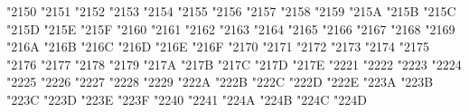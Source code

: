 {\Uchar\jis"2150 %
\Uchar\jis"2151 %
\Uchar\jis"2152 %
\Uchar\jis"2153 %
\Uchar\jis"2154 %
\Uchar\jis"2155 %
\Uchar\jis"2156 %
\Uchar\jis"2157 %
\Uchar\jis"2158 %
\Uchar\jis"2159 %
\Uchar\jis"215A %
\Uchar\jis"215B %
\Uchar\jis"215C %
\Uchar\jis"215D %
\Uchar\jis"215E %
\Uchar\jis"215F %
\Uchar\jis"2160 %
\Uchar\jis"2161 %
\Uchar\jis"2162 %
\Uchar\jis"2163 %
\Uchar\jis"2164 %
\Uchar\jis"2165 %
\Uchar\jis"2166 %
\Uchar\jis"2167 %
\Uchar\jis"2168 %
\Uchar\jis"2169 %
\Uchar\jis"216A %
\Uchar\jis"216B %
\Uchar\jis"216C %
\Uchar\jis"216D %
\Uchar\jis"216E %
\Uchar\jis"216F %
\Uchar\jis"2170 %
\Uchar\jis"2171 %
\Uchar\jis"2172 %
\Uchar\jis"2173 %
\Uchar\jis"2174 %
\Uchar\jis"2175 %
\Uchar\jis"2176 %
\Uchar\jis"2177 %
\Uchar\jis"2178 %
\Uchar\jis"2179 %
\Uchar\jis"217A %
\Uchar\jis"217B %
\Uchar\jis"217C %
\Uchar\jis"217D %
\Uchar\jis"217E %
\Uchar\jis"2221 %
\Uchar\jis"2222 %
\Uchar\jis"2223 %
\Uchar\jis"2224 %
\Uchar\jis"2225 %
\Uchar\jis"2226 %
\Uchar\jis"2227 %
\Uchar\jis"2228 %
\Uchar\jis"2229 %
\Uchar\jis"222A %
\Uchar\jis"222B %
\Uchar\jis"222C %
\Uchar\jis"222D %
\Uchar\jis"222E %
\Uchar\jis"223A %
\Uchar\jis"223B %
\Uchar\jis"223C %
\Uchar\jis"223D %
\Uchar\jis"223E %
\Uchar\jis"223F %
\Uchar\jis"2240 %
\Uchar\jis"2241 %
\Uchar\jis"224A %
\Uchar\jis"224B %
\Uchar\jis"224C %
\Uchar\jis"224D %
}
